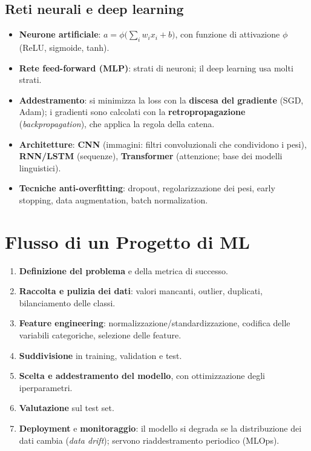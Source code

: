 \subsection{Reti neurali e deep learning}
\begin{itemize}
    \item \textbf{Neurone artificiale}: $a = \phi\bigl(\sum_i w_i x_i + b\bigr)$, con funzione di attivazione $\phi$ (ReLU, sigmoide, tanh).
    \item \textbf{Rete feed-forward (MLP)}: strati di neuroni; il deep learning usa molti strati.
    \item \textbf{Addestramento}: si minimizza la loss con la \textbf{discesa del gradiente} (SGD, Adam); i gradienti sono calcolati con la \textbf{retropropagazione} (\emph{backpropagation}), che applica la regola della catena.
    \item \textbf{Architetture}: \textbf{CNN} (immagini: filtri convoluzionali che condividono i pesi), \textbf{RNN/LSTM} (sequenze), \textbf{Transformer} (attenzione; base dei modelli linguistici).
    \item \textbf{Tecniche anti-overfitting}: dropout, regolarizzazione dei pesi, early stopping, data augmentation, batch normalization.
\end{itemize}

\section{Flusso di un Progetto di ML}
\begin{enumerate}
    \item \textbf{Definizione del problema} e della metrica di successo.
    \item \textbf{Raccolta e pulizia dei dati}: valori mancanti, outlier, duplicati, bilanciamento delle classi.
    \item \textbf{Feature engineering}: normalizzazione/standardizzazione, codifica delle variabili categoriche, selezione delle feature.
    \item \textbf{Suddivisione} in training, validation e test.
    \item \textbf{Scelta e addestramento del modello}, con ottimizzazione degli iperparametri.
    \item \textbf{Valutazione} sul test set.
    \item \textbf{Deployment} e \textbf{monitoraggio}: il modello si degrada se la distribuzione dei dati cambia (\emph{data drift}); servono riaddestramento periodico (MLOps).
\end{enumerate}

